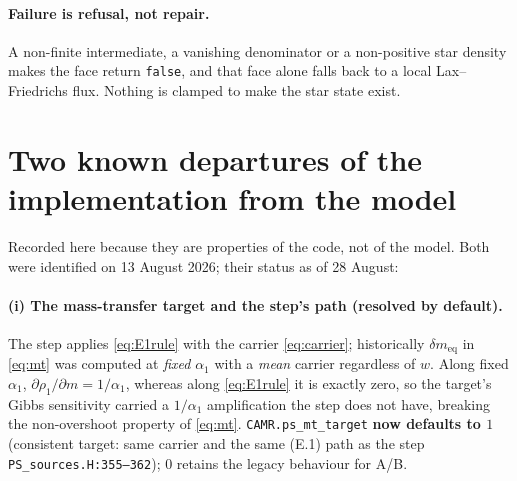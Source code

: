 \documentclass[11pt,a4paper]{article}
\newcommand{\code}[1]{\texttt{\small #1}}
\newcommand{\src}[1]{{\color{gray}\code{#1}}}
\begin{document}
\paragraph{Failure is refusal, not repair.}
A non-finite intermediate, a vanishing denominator or a non-positive star
density makes the face return \code{false}, and that face alone falls back to a
local Lax--Friedrichs flux.  Nothing is clamped to make the star state exist.

\section{Two known departures of the implementation from the model}
\label{sec:caveats}

Recorded here because they are properties of the code, not of the model.
Both were identified on 13 August 2026; their status as of 28 August:

\paragraph{(i) The mass-transfer target and the step's path (resolved by
default).}
The step applies \eqref{eq:E1rule} with the carrier \eqref{eq:carrier};
historically $\delta m_{\mathrm{eq}}$ in \eqref{eq:mt} was computed at
\emph{fixed} $\alpha_1$ with a \emph{mean} carrier regardless of $w$.
Along fixed $\alpha_1$, $\partial\rho_1/\partial m = 1/\alpha_1$, whereas
along \eqref{eq:E1rule} it is exactly zero, so the target's Gibbs
sensitivity carried a $1/\alpha_1$ amplification the step does not have,
breaking the non-overshoot property of \eqref{eq:mt}.
\code{CAMR.ps\_mt\_target} \textbf{now defaults to $1$} (consistent
target: same carrier and the same (E.1) path as the step
\src{PS\_sources.H:355--362}); $0$ retains the legacy behaviour for A/B.
\end{document}
